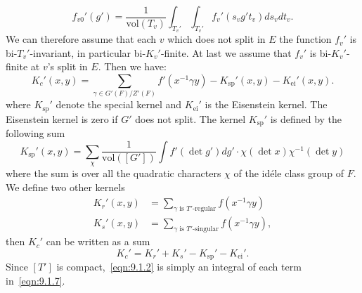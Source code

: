 \begin{equation*}
    f_{v0}'(g') = \frac{1}{\mathrm{vol}(T_v)} \int_{T_v'} \int_{T_v'} f_v'(s_v g' t_v) ds_v dt_v.
\end{equation*}
We can therefore assume that each $v$ which does not split in $E$ the function $f_v'$ is bi-$T_v'$-invariant, in particular 
bi-$K_v'$-finite. 
At last we assume that $f_v'$ is bi-$K_v'$-finite at $v$'s split in $E$. 
Then we have:
\begin{equation}
    K_c'(x, y) = \sum_{\gamma \in G'(F)/Z'(F)} f'(x^{-1}\gamma y) - K_{\mathrm{sp}}' (x, y) - K_{\mathrm{ei}}' (x, y).
\end{equation}
where $K_{\mathrm{sp}}'$ denote the special kernel and $K_{\mathrm{ei}}'$ is the Eisenstein kernel.
The Eisenstein kernel is zero if $G'$ does not split.
The kernel $K_{\mathrm{sp}}'$ is defined by the following sum
\begin{equation}
    \label{eqn:9.1.4}
    K_{\mathrm{sp}}'(x, y) = \sum_{\chi} \frac{1}{\mathrm{vol}([G'])} \int f'(\det g') dg' \cdot \chi(\det x)\chi^{-1}(\det y)
\end{equation}
where the sum is over all the quadratic characters $\chi$ of the id\'ele class group of $F$.
We define two other kernels
\begin{align}
    K_{r}'(x, y) &= \sum_{\gamma\text{ is }T'\text{-regular}} f(x^{-1}\gamma y) \\
    K_{s}'(x, y) &= \sum_{\gamma\text{ is }T'\text{-singular}} f(x^{-1}\gamma y),
\end{align}
then $K_c'$ can be written as a sum
\begin{equation}
    \label{eqn:9.1.7}
    K_c' = K_r' + K_s' - K_{\mathrm{sp}}' - K_{\mathrm{ei}}'.
\end{equation}
Since $[T']$ is compact,~\eqref{eqn:9.1.2} is simply an integral of each term in~\eqref{eqn:9.1.7}.


